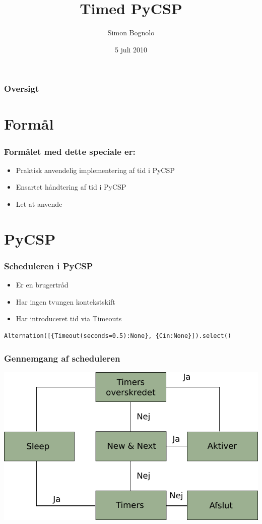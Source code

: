\documentclass[12pt]{beamer}
\title
{Timed PyCSP}
\institute
{Datalogisk Institut \\ Københavns Universitet}
\author
{Simon Bognolo}
\date
{5 juli 2010}
\begin{document}
\frame[plain]\titlepage
 
\begin{frame}
  \frametitle{Oversigt}
  \tableofcontents
\end{frame}

\section{Formål}
\begin{frame}
  \frametitle{Formålet med dette speciale er:}
  \begin{itemize}
	\item Praktisk anvendelig implementering af tid i PyCSP
	\item Ensartet håndtering af tid i PyCSP
	\item Let at anvende
  \end{itemize}
\end{frame}

 
\section{PyCSP}
\begin{frame} [fragile]
  \frametitle{Scheduleren i PyCSP}
  \begin{itemize}
	\item Er en brugertråd
	\item Har ingen tvungen kontekstskift
	\item Har introduceret tid via Timeouts
  \end{itemize}
\begin{lstlisting}
Alternation([{Timeout(seconds=0.5):None}, {Cin:None}]).select()
\end{lstlisting}
\end{frame}

\begin{frame}
  \frametitle{Gennemgang af scheduleren}
  \includegraphics[scale=0.9]{pycsp-scheduler} 
\end{frame}
\end{document}
